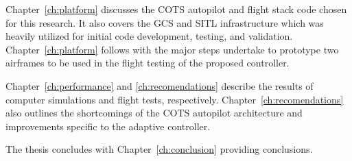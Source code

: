 Chapter~\ref{ch:platform} discusses the \ac{COTS} autopilot and flight stack code chosen for this research.  It also covers the \ac{GCS} and \ac{SITL} infrastructure which was heavily utilized for initial code development, testing, and validation.  Chapter~\ref{ch:platform} follows with the major steps undertake to prototype two airframes to be used in the flight testing of the proposed controller.

Chapter~\ref{ch:performance} and \ref{ch:recomendations} describe the results of computer simulations and flight tests, respectively.  Chapter~\ref{ch:recomendations} also outlines the shortcomings of the \ac{COTS} autopilot architecture and improvements specific to the \Lone adaptive controller.

The thesis concludes with Chapter~\ref{ch:conclusion} providing conclusions.






